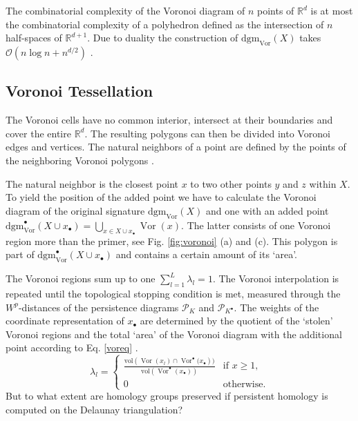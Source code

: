 \documentclass[runningheads]{llncs}
\DeclareMathOperator{\Vor}{\text{Vor}}
\begin{document}
The combinatorial complexity of the Voronoi diagram of $n$ points of $\mathbb{R}^d$ is at most the combinatorial complexity of a polyhedron defined as the intersection of $n$ half-spaces of $\mathbb{R}^{d+1}$. Due to duality the construction of $\text{dgm}_{\Vor}(X)$ takes $\mathcal{O}( n \log n+n^{d/2})$  \cite{BoissonnatDG18}.

\subsection{Voronoi Tessellation}
The Voronoi cells have no common interior, intersect at their boundaries and cover the entire $\mathbb{R}^d$. The resulting polygons can then be divided into Voronoi edges and vertices. The natural neighbors of a point are defined by the points of the neighboring Voronoi polygons \cite{Sibson}.

The natural neighbor is the closest point $x$ to two other points $y$ and $z$ within $X$. To yield the position of the added point we have to calculate the Voronoi diagram of the original signature $\text{dgm}_{\Vor}(X)$ and one with an added point $\text{dgm}_{\Vor}^{\bullet}(X\cup x_{\bullet}) = \bigcup_{x \in X \cup x_\bullet} \Vor(x)$. The latter consists of one Voronoi region more than the primer, see Fig. \ref{fig:voronoi} (a) and (c). This polygon is part of $\text{dgm}_{\Vor}^{\bullet}(X\cup x_{\bullet})$ and contains a certain amount of its `area'.

The Voronoi regions sum up to one $\sum_{l=1}^{L} \lambda_l = 1$. The Voronoi interpolation is repeated until the topological stopping condition is met, measured through the $W^p$-distances of the persistence diagrams $\mathcal{P}_{K}$ and $\mathcal{P}_{K^\bullet}$. The weights of the coordinate representation of $x_{\bullet}$ are determined by the quotient of the `stolen' Voronoi regions and the total `area' of the Voronoi diagram with the additional point according to Eq. \ref{voreq} \cite{Anton2001}. 
\begin{equation}
  \label{voreq}
    \lambda_{l} =
    \begin{cases}
        \frac{\text{vol}\left(\Vor(x_l) \cap \Vor^{\bullet}(x_{\bullet}\right))}{\text{vol}\left(\Vor^{\bullet}(x_{\bullet})\right)} & \text{if } x\geq 1,\\
        0 & \text{otherwise.}
    \end{cases}
\end{equation}
But to what extent are homology groups preserved if persistent homology is computed on the Delaunay triangulation?
\end{document}
